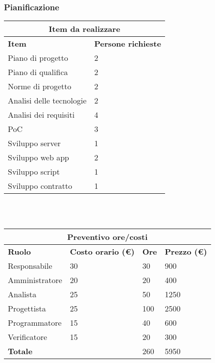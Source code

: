 \documentclass[a4paper, 12pt]{article}
\begin{document}
\subsubsection{Pianificazione}\mbox{}


\begin{center}
    \begin{tabularx}{\textwidth}{|X|X|}
        \hline
        \multicolumn{2}{|c|}{\textbf{Item da realizzare}}\\
        \hline
        \hline
        \textbf{Item} & \textbf{Persone richieste}\\
        \hline
        Piano di progetto & 2\\
        \hline
        Piano di qualifica & 2\\
        \hline
        Norme di progetto & 2\\
        \hline
        Analisi delle tecnologie & 2\\
        \hline
        Analisi dei requisiti & 4\\
        \hline
        PoC & 3\\
        \hline
        Sviluppo server & 1\\
        \hline
        Sviluppo web app & 2\\
        \hline
        Sviluppo script  & 1\\
        \hline
        Sviluppo contratto & 1\\
        \hline
    \end{tabularx}\\[8pt]
    \mbox{}\\
\end{center}

\begin{center}
    \begin{tabularx}{\textwidth}{|X|X|X|X|}
        \hline
        \multicolumn{4}{|c|}{\textbf{Preventivo ore/costi}}\\
        \hline
        \hline
        \textbf{Ruolo} & \textbf{Costo orario (\euro)} & \textbf{Ore} & \textbf{Prezzo (\euro)}\\
        \hline
        Responsabile    & 30 & 30  & 900\\
        \hline
        Amministratore  & 20 & 20  & 400\\
        \hline
        Analista        & 25 & 50  & 1250\\
        \hline
        Progettista     & 25 & 100  & 2500\\
        \hline
        Programmatore   & 15 & 40  & 600\\
        \hline
        Verificatore    & 15 & 20  & 300\\
        \hline
        \hline
        \textbf{Totale} &    & 260 & 5950\\
        \hline
    \end{tabularx}\\[8pt]
    \mbox{}\\
\end{center}
\end{document}

